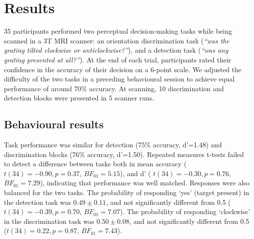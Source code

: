 \documentclass[12pt,twoside]{reedthesis}
\begin{document}
\hypertarget{results-7}{%
\section{Results}\label{results-7}}

35 participants performed two perceptual decision-making tasks while being scanned in a 3T MRI scanner: an orientation discrimination task (\emph{``was the grating tilted clockwise or anticlockwise?''}), and a detection task (\emph{``was any grating presented at all?''}). At the end of each trial, participants rated their confidence in the accuracy of their decision on a 6-point scale. We adjusted the difficulty of the two tasks in a preceding behavioural session to achieve equal performance of around 70\% accuracy. At scanning, 10 discrimination and detection blocks were presented in 5 scanner runs.

\hypertarget{behavioural-results}{%
\subsection{Behavioural results}\label{behavioural-results}}

Task performance was similar for detection (75\% accuracy, d'=1.48) and discrimination blocks (76\% accuracy, d'=1.50). Repeated measures t-tests failed to detect a difference between tasks both in mean accuracy (\(t(34) = -0.90, p = 0.37\), \(BF_{01}= 5.15\)), and d' ( \(t(34) = -0.30, p = 0.76\), \(BF_{01}=7.29\)), indicating that performance was well matched. Responses were also balanced for the two tasks. The probability of responding `yes' (target present) in the detection task was \(0.49 \pm 0.11\), and not significantly different from 0.5 (\(t(34) = -0.39, p = 0.70\), \(BF_{01}=7.07\)). The probability of responding `clockwise' in the discrimination task was \(0.50 \pm 0.08\), and not significantly different from 0.5 (\(t(34) = 0.22, p=0.87\), \(BF_{01}=7.43\)).
\end{document}
